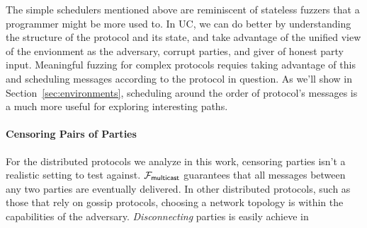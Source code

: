 %
The simple schedulers mentioned above are reminiscent of stateless fuzzers that a programmer might be more used to.
In UC, we can do better by understanding the structure of the protocol and its state, and take advantage of the unified view of the envionment as the adversary, corrupt parties, and giver of honest party input.
Meaningful fuzzing for complex protocols requies taking advantage of this and scheduling messages according to the protocol in question. 
As we'll show in Section~\ref{sec:environments}, scheduling around the order of protocol's messages is a much more useful for exploring interesting paths.

\paragraph{Censoring Pairs of Parties}
For the distributed protocols we analyze in this work, censoring parties isn't a realistic setting to test against.
$\mathcal{F}_{{\mathsf {multicast}}}$ guarantees that all messages between any two parties are eventually delivered.
In other distributed protocols, such as those that rely on gossip protocols, choosing a network topology is within the capabilities of the adversary.
\emph{Disconnecting} parties is easily achieve in \us {}

